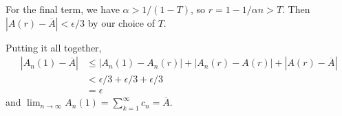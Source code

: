 \documentclass[oneside]{article}
\newcommand\abs[1]{\left|#1\right|}
\begin{document}
\begin{enumerate}[label=(\alph*)]
    For the final term, we have $\alpha > 1/(1-T)$, so $r = 1 - 1/\alpha n > T$. Then $\abs{A(r) - \overline{A}} < \epsilon/3$ by our choice of $T$.

    Putting it all together, \begin{align*}
      \abs{A_n(1) - \overline{A}}
      &\leq \abs{A_n(1) - A_n(r)}  + \abs{A_n(r) - A(r)} + \abs{A(r) - \overline{A}} \\
      &< \epsilon/3 + \epsilon/3 + \epsilon/3 \\
      &= \epsilon
    \end{align*}
    and $\lim_{n\to\infty} A_n(1) = \sum_{k=1}^\infty c_n = \overline{A}$.
  \end{enumerate}
\end{document}
